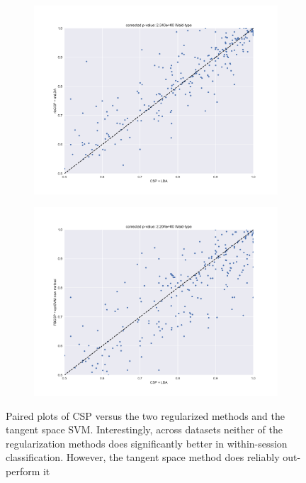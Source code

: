 \begin{figure}
    \begin{subfigure}[h]{0.3\textwidth}
        \includegraphics[width=\textwidth]{Figures/CSP2.pdf}
    \end{subfigure}
    \begin{subfigure}[h]{0.3\textwidth}
        \includegraphics[width=\textwidth]{Figures/CSP3.pdf}
    \end{subfigure}
    \caption{Paired plots of CSP versus the two regularized methods
      and the tangent space SVM. Interestingly, across datasets
      neither of the regularization methods does significantly better
      in within-session classification. However, the tangent space
      method does reliably out-perform it}
    \label{fig:csp}
\end{figure}
